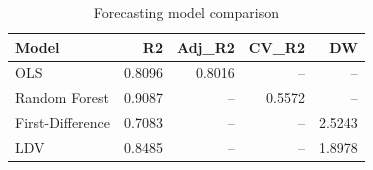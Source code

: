 \begin{table}[htbp]
\centering
\caption{Forecasting model comparison}
\label{tab:model_comparison}
\begin{tabular}{lrrrr}
\toprule
Model & R2 & Adj\_R2 & CV\_R2 & DW \\
\midrule
  OLS & 0.8096 & 0.8016 & -- & -- \\
  Random Forest & 0.9087 & -- & 0.5572 & -- \\
  First-Difference & 0.7083 & -- & -- & 2.5243 \\
  LDV & 0.8485 & -- & -- & 1.8978 \\
\bottomrule
\end{tabular}
\end{table}